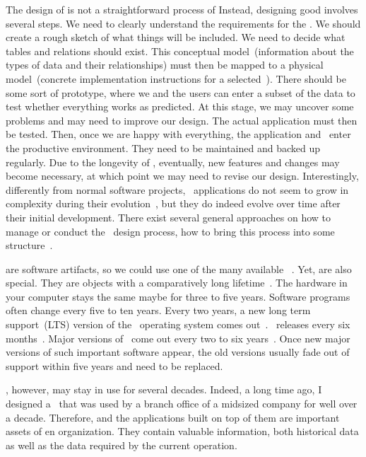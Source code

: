 %
The design of  is not a straightforward process of 
Instead, designing good  involves several steps.
We need to clearly understand the requirements for the \db.
We should create a rough sketch of what things will be included.
We need to decide what tables and relations should exist.
This conceptual model~(information about the types of data and their relationships) must then be mapped to a physical model~(concrete implementation instructions for a selected~\dbms).
There should be some sort of prototype, where we and the users can enter a subset of the data to test whether everything works as predicted.
At this stage, we may uncover some problems and may need to improve our design.
The actual application must then be tested.
Then, once we are happy with everything, the application and \db\ enter the productive environment.
They need to be maintained and backed up regularly.
Due to the longevity of , eventually, new features and changes may become necessary, at which point we may need to revise our design.
Interestingly, differently from normal software projects, \db~applications do not seem to grow in complexity during their evolution~\cite{SVZ2014OSD}, but they do indeed evolve over time after their initial development.
There exist several general approaches on how to manage or conduct the \db\ design process, how to bring this process into some structure~\cite{GMTM2011DDLC}.

 are software artifacts, so we could use one of the many available ~\cite{I2018SAH,N2024SEFDS}.
Yet,  are also special.
They are objects with a comparatively long lifetime~\cite{SS2005EIDDDFDB:I}.
The hardware in your computer stays the same maybe for three to five years.
Software programs often change every five to ten years.
Every two years, a new long term support~(LTS) version of the \ubuntu\ operating system comes out~\cite{C2024TULARC}.
\libreoffice\ releases every six months~\cite{DF2024TDFWR}.
Major versions of \microsoftWindows\ come out every two to six years~\cite{EOEBEB:LOWV}.
Once new major versions of such important software appear, the old versions usually fade out of support within five years and need to be replaced.

, however, may stay in use for several decades.
Indeed, a long time ago, I designed a \db\ that was used by a branch office of a midsized company for well over a decade.
Therefore,  and the applications built on top of them are important assets of en organization.
They contain valuable information, both historical data as well as the data required by the current operation.


